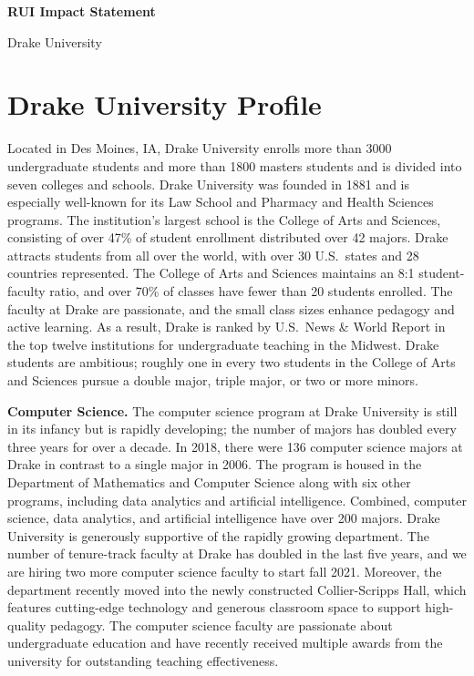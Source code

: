 \documentclass[11pt]{article}
\begin{document}
    \setcounter{page}{1}
    \begin{center}
        {\Large {\bf RUI Impact Statement}}
    \end{center}

    \begin{center}
        {\Large Drake University}
    \end{center}

    \section{Drake University Profile}
    Located in Des Moines, IA, Drake University enrolls more than 3000 undergraduate students and more than 1800 masters students
    and is divided into seven colleges and schools.
    Drake University was founded in 1881 and is especially well-known for its Law School and Pharmacy and Health Sciences programs.
    The institution's largest school is the College of Arts and Sciences, consisting of over 47\% of student enrollment distributed over 42 majors.
    Drake attracts students from all over the world, with over 30 U.S.\ states and 28 countries represented.
    The College of Arts and Sciences maintains an 8:1 student-faculty ratio, and over 70\% of classes have fewer than 20 students enrolled.
    The faculty at Drake are passionate, and the small class sizes enhance pedagogy and active learning.
    As a result, Drake is ranked by U.S.\ News \& World Report in the top twelve institutions for undergraduate teaching in the Midwest.
    Drake students are ambitious; roughly one in every two students in the College of Arts and Sciences pursue a double major, triple major, or two or more minors.

    \textbf{Computer Science.}
    The computer science program at Drake University is still in its infancy but is rapidly developing; the number of majors has doubled every three years for over a decade.
    In 2018, there were 136 computer science majors at Drake in contrast to a single major in 2006.
    The program is housed in the Department of Mathematics and Computer Science along with six other programs, including data analytics and artificial intelligence.
    Combined, computer science, data analytics, and artificial intelligence have over 200 majors.
    Drake University is generously supportive of the rapidly growing department.
    The number of tenure-track faculty at Drake has doubled in the last five years, and we are hiring two more computer science faculty to start fall 2021.
    Moreover, the department recently moved into the newly constructed Collier-Scripps Hall, which features cutting-edge technology and generous classroom space to support high-quality pedagogy.
    The computer science faculty are passionate about undergraduate education and have recently received multiple awards from the university for outstanding teaching effectiveness.
\end{document}
